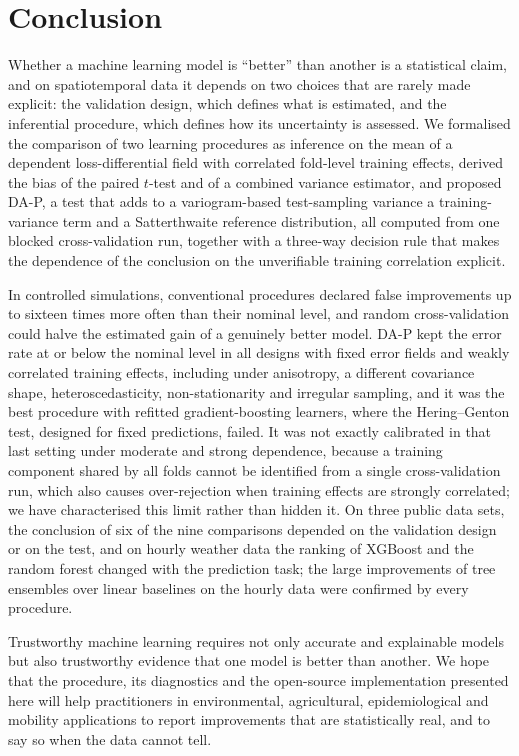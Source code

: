 \section{Conclusion}\label{sec:conclusion}

Whether a machine learning model is ``better'' than another is a statistical claim, and on spatiotemporal data it depends on two choices that are rarely made explicit: the validation design, which defines what is estimated, and the inferential procedure, which defines how its uncertainty is assessed. We formalised the comparison of two learning procedures as inference on the mean of a dependent loss-differential field with correlated fold-level training effects, derived the bias of the paired $t$-test and of a combined variance estimator, and proposed DA-P, a test that adds to a variogram-based test-sampling variance a training-variance term and a Satterthwaite reference distribution, all computed from one blocked cross-validation run, together with a three-way decision rule that makes the dependence of the conclusion on the unverifiable training correlation explicit.

In controlled simulations, conventional procedures declared false improvements up to sixteen times more often than their nominal level, and random cross-validation could halve the estimated gain of a genuinely better model. DA-P kept the error rate at or below the nominal level in all designs with fixed error fields and weakly correlated training effects, including under anisotropy, a different covariance shape, heteroscedasticity, non-stationarity and irregular sampling, and it was the best procedure with refitted gradient-boosting learners, where the Hering--Genton test, designed for fixed predictions, failed. It was not exactly calibrated in that last setting under moderate and strong dependence, because a training component shared by all folds cannot be identified from a single cross-validation run, which also causes over-rejection when training effects are strongly correlated; we have characterised this limit rather than hidden it. On three public data sets, the conclusion of six of the nine comparisons depended on the validation design or on the test, and on hourly weather data the ranking of XGBoost and the random forest changed with the prediction task; the large improvements of tree ensembles over linear baselines on the hourly data were confirmed by every procedure.

Trustworthy machine learning requires not only accurate and explainable models but also trustworthy evidence that one model is better than another. We hope that the procedure, its diagnostics and the open-source implementation presented here will help practitioners in environmental, agricultural, epidemiological and mobility applications to report improvements that are statistically real, and to say so when the data cannot tell.
